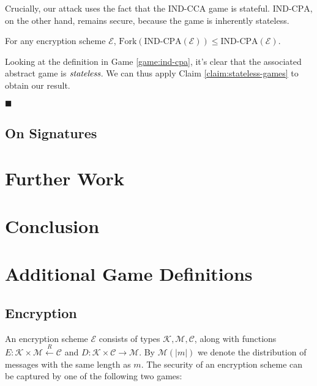 Crucially, our attack uses the fact that the $\text{IND-CCA}$ game
is stateful.
$\text{IND-CPA}$, on the other hand, remains secure, because
the game is inherently stateless.

\begin{claim}
\label{claim:ind-cpa-secure}
For any encryption scheme $\mathcal{E}$,
$\text{Fork}(\text{IND-CPA}(\mathcal{E})) \leq \text{IND-CPA}(\mathcal{E})$.
\end{claim}

Looking at the definition in Game \ref{game:ind-cpa}, it's clear
that the associated abstract game is $\emph{stateless}$.
We can thus apply Claim \ref{claim:stateless-games} to obtain our result.

$\blacksquare$

\subsection{On Signatures}

\section{Further Work}

\section{Conclusion}


{\small }
\clearpage
\appendix

\section{Additional Game Definitions}

\subsection{Encryption}

An encryption scheme $\mathcal{E}$ consists of types $\mathcal{K}, \mathcal{M}, \mathcal{C}$,
along with functions $E : \mathcal{K} \times \mathcal{M} \xleftarrow{R} \mathcal{C}$ and $D : \mathcal{K} \times \mathcal{C} \to \mathcal{M}$.
By $\mathcal{M}(|m|)$ we denote the distribution of messages with the same
length as $m$.
The security of an encryption scheme can be captured by one of the following
two games:

